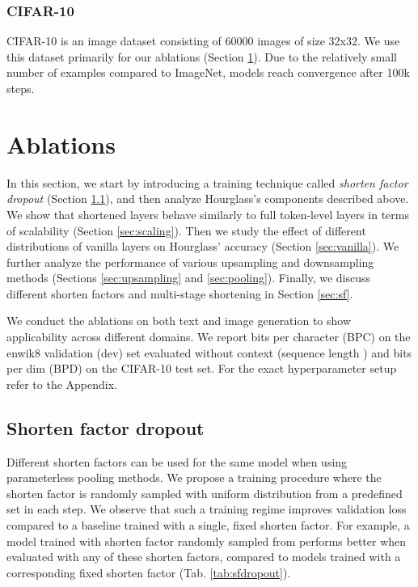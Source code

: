 \documentclass[11pt]{article}
\begin{document}
\subsubsection{CIFAR-10} 
CIFAR-10 \cite{Krizhevsky09learningmultiple} is an image dataset consisting of 60000 images of size 32x32. We use this dataset primarily for our ablations (Section \ref{sec:ablation}). Due to the relatively small number of examples compared to ImageNet, models reach convergence after 100k steps.

\setlength{\textfloatsep}{0.5em}
\section{Ablations}\label{sec:ablation}
In this section, we start by introducing a training technique called \emph{shorten factor dropout} (Section \ref{sec:sfdropout}), and then analyze Hourglass's components described above. We show that shortened layers behave similarly to full token-level layers in terms of scalability (Section \ref{sec:scaling}). Then we study the effect of different distributions of  vanilla layers on Hourglass' accuracy (Section \ref{sec:vanilla}). We further analyze the performance of various upsampling and downsampling methods (Sections \ref{sec:upsampling} and \ref{sec:pooling}). Finally, we discuss different shorten factors and multi-stage shortening in Section \ref{sec:sf}. 

We conduct the ablations on both text and image generation to show applicability across different domains.
We report bits per character (BPC) on the enwik8 validation (dev) set evaluated without context (sequence length ) and bits per dim (BPD) on the CIFAR-10 test set.
For the exact hyperparameter setup refer to the Appendix.

\subsection{Shorten factor dropout}\label{sec:sfdropout}

Different shorten factors can be used for the same model when using parameterless pooling methods. We propose a training procedure where the shorten factor is randomly sampled with uniform distribution from a predefined set in each step. We observe that such a training regime improves validation loss compared to a baseline trained with a single, fixed shorten factor.
For example, a model trained with shorten factor randomly sampled from  performs better when evaluated with any of these shorten factors, compared to models trained with a corresponding fixed shorten factor (Tab. \ref{tab:sfdropout}).
\end{document}
